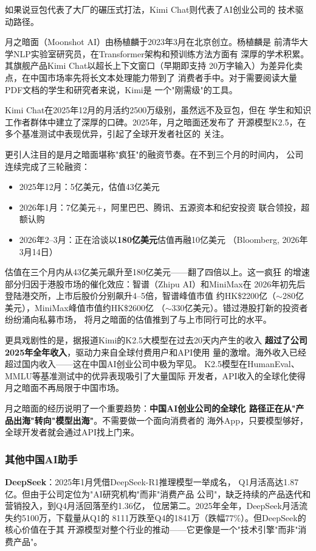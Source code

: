 如果说豆包代表了大厂的碾压式打法，Kimi Chat则代表了AI创业公司的
技术驱动路径。

月之暗面（Moonshot AI）由杨植麟于2023年3月在北京创立。杨植麟是
前清华大学NLP实验室研究员，在Transformer架构和预训练方法方面有
深厚的学术积累。其旗舰产品Kimi Chat以超长上下文窗口（早期即支持
20万字输入）为差异化卖点，在中国市场率先将长文本处理能力带到了
消费者手中。对于需要阅读大量PDF文档的学生和研究者来说，Kimi是
一个"刚需级"的工具。

Kimi Chat在2025年12月的月活约2500万级别，虽然远不及豆包，但在
学生和知识工作者群体中建立了深厚的口碑。2025年，月之暗面还发布了
开源模型K2.5，在多个基准测试中表现优异，引起了全球开发者社区的
关注。

更引人注目的是月之暗面堪称"疯狂"的融资节奏。在不到三个月的时间内，
公司连续完成了三轮融资：

\begin{itemize}
  \item 2025年12月：5亿美元，估值43亿美元
  \item 2026年1月：7亿美元+，阿里巴巴、腾讯、五源资本和纪安投资
    联合领投，超额认购
  \item 2026年2--3月：正在洽谈以\textbf{180亿美元}估值再融10亿美元
    （Bloomberg, 2026年3月14日）
\end{itemize}

估值在三个月内从43亿美元飙升至180亿美元——翻了四倍以上。这一疯狂
的增速部分归因于港股市场的催化效应：智谱（Zhipu AI）和MiniMax在
2026年初先后登陆港交所，上市后股价分别飙升4--5倍，智谱峰值市值
约HK\$2200亿（$\sim$280亿美元），MiniMax峰值市值约HK\$2600亿
（$\sim$330亿美元）。错过港股打新的投资者纷纷涌向私募市场，
将月之暗面的估值推到了与上市同行可比的水平。

更具戏剧性的是，据报道Kimi的K2.5大模型在过去20天内产生的收入
\textbf{超过了公司2025年全年收入}，驱动力来自全球付费用户和API使用
量的激增。海外收入已经超过国内收入——这在中国AI创业公司中极为罕见。
K2.5模型在HumanEval、MMLU等基准测试中的优异表现吸引了大量国际
开发者，API收入的全球化使得月之暗面不再局限于中国市场。

月之暗面的经历说明了一个重要趋势：\textbf{中国AI创业公司的全球化
路径正在从"产品出海"转向"模型出海"}。不需要做一个面向消费者的
海外App，只要模型够好，全球开发者就会通过API找上门来。

\subsubsection{其他中国AI助手}

\textbf{DeepSeek}：2025年1月凭借DeepSeek-R1推理模型一举成名，
Q1月活高达1.87亿。但由于公司定位为"AI研究机构"而非"消费产品
公司"，缺乏持续的产品迭代和营销投入，到Q4月活回落至约1.36亿，
位居第二。2025年全年，DeepSeek月活流失约5100万，下载量从Q1的
8111万跌至Q4的1841万（跌幅77\%）。但DeepSeek的核心价值在于其
开源模型对整个行业的推动——它更像是一个"技术引擎"而非"消费产品"。


